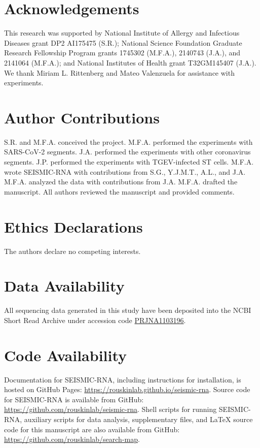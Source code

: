 \documentclass[main.tex]{subfiles}
\begin{document}
\section{Acknowledgements}

This research was supported by National Institute of Allergy and Infectious Diseases grant DP2 AI175475 (S.R.); National Science Foundation Graduate Research Fellowship Program grants 1745302 (M.F.A.), 2140743 (J.A.), and 2141064 (M.F.A.); and National Institutes of Health grant T32GM145407 (J.A.).
We thank Miriam L. Rittenberg and Mateo Valenzuela for assistance with experiments.


\section{Author Contributions}

S.R. and M.F.A. conceived the project.
M.F.A. performed the experiments with SARS-CoV-2 segments.
J.A. performed the experiments with other coronavirus segments.
J.P. performed the experiments with TGEV-infected ST cells.
M.F.A. wrote SEISMIC-RNA with contributions from S.G., Y.J.M.T., A.L., and J.A.
M.F.A. analyzed the data with contributions from J.A.
M.F.A. drafted the manuscript.
All authors reviewed the manuscript and provided comments.


\section{Ethics Declarations}

The authors declare no competing interests.


\section{Data Availability}

All sequencing data generated in this study have been deposited into the NCBI Short Read Archive under accession code \href{https://www.ncbi.nlm.nih.gov/bioproject/PRJNA1103196}{PRJNA1103196}.


\section{Code Availability}

Documentation for SEISMIC-RNA, including instructions for installation, is hosted on GitHub Pages: \url{https://rouskinlab.github.io/seismic-rna}.
Source code for SEISMIC-RNA is available from GitHub: \url{https://github.com/rouskinlab/seismic-rna}. 
Shell scripts for running SEISMIC-RNA, auxiliary scripts for data analysis, supplementary files, and LaTeX source code for this manuscript are also available from GitHub: \url{https://github.com/rouskinlab/search-map}.
\end{document}
